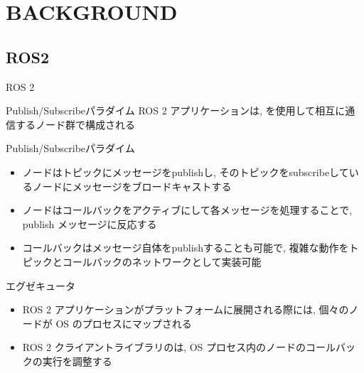 

\section{BACKGROUND}
\label{sec: background}


\subsection{ROS2}
\label{ssec: ros2}

\begin{frame}{ROS 2}
\end{frame}

\begin{frame}{Publish/Subscribeパラダイム}
    ROS 2 アプリケーションは, を使用して相互に通信するノード群で構成される

    \begin{block}{Publish/Subscribeパラダイム}
        \setlength{\linewidth}{0.98\columnwidth}
        \begin{itemize}
            \item ノードはトピックにメッセージをpublishし, そのトピックをsubscribeしているノードにメッセージをブロードキャストする
            \item ノードはコールバックをアクティブにして各メッセージを処理することで, publish メッセージに反応する
            \item コールバックはメッセージ自体をpublishすることも可能で, 複雑な動作をトピックとコールバックのネットワークとして実装可能
        \end{itemize}
    \end{block}
\end{frame}

\begin{frame}{エグゼキュータ}
    \begin{itemize}
        \item ROS 2 アプリケーションがプラットフォームに展開される際には, 個々のノードが OS のプロセスにマップされる
        \item ROS 2 クライアントライブラリのは, OS プロセス内のノードのコールバックの実行を調整する
    \end{itemize}
\end{frame}

